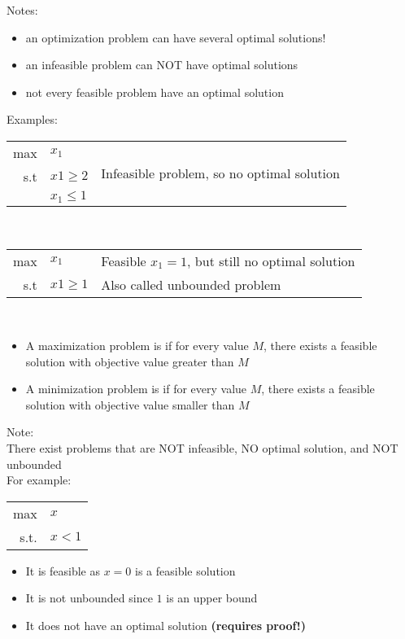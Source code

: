 \documentclass[letterpaper, 12pt]{article}
\newcommand{\red}[1]{{\color{red}{#1}}}
\begin{document}
    Notes:\\
    \begin{itemize}
        \item an optimization problem can have several optimal solutions!
        \item an infeasible problem can NOT have optimal solutions
        \item not every feasible problem have an optimal solution
    \end{itemize}

    Examples:\\
    \begin{tabular}{|rl|l}
        \cline{1-2}
        max & $x_1$ & \multirow{3}{*}{Infeasible problem, so no optimal solution}\\
        s.t & $x1 \geq 2$\\
        & $x_1 \leq 1$\\
        \cline{1-2}
    \end{tabular}
    \bigskip\\
    \begin{tabular}{|rl|l}
        \cline{1-2}
        max & $x_1$ & Feasible $x_1 = 1$, but still no optimal solution\\
        s.t & $x1 \geq 1$ & Also called unbounded problem\\
        \cline{1-2}
    \end{tabular}
    \pagebreak

    \red{\textbf{Unboundedness:}}\\
    \begin{itemize}
        \item A maximization problem is \red{unbounded} if for every value $M$, there exists
         a feasible solution with objective value greater than $M$
        \item A minimization problem is \red{unbounded} if for every value $M$, there exists 
         a feasible solution with objective value smaller than $M$
    \end{itemize}

    Note:\\
    There exist problems that are NOT infeasible, NO optimal solution, and NOT unbounded\\
    \bigskip
    For example:\\
    \begin{tabular}{rl}
        max & $x$\\
        s.t. & $x < 1$\\
    \end{tabular}
    \begin{itemize}
        \item It is feasible as $x = 0$ is a feasible solution
        \item It is not unbounded since $1$ is an upper bound
        \item It does not have an optimal solution \textbf{(requires proof!)}
    \end{itemize}
\end{document}
